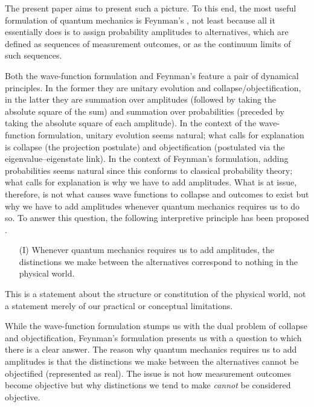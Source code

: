 The present paper aims to present such a picture. To this end, the most useful formulation of quantum mechanics is Feynman's \citep{FHS}, not least because all it essentially does is to assign probability amplitudes to alternatives, which are defined as sequences of measurement outcomes, or as the continuum limits of such sequences. 

Both the wave-function formulation and Feynman's feature a pair of dynamical principles. In the former they are unitary evolution and collapse/objectification, in the latter they are summation over amplitudes (followed by taking the absolute square of the sum) and summation over probabilities (preceded by taking the absolute square of each amplitude). In the context of the wave-function formulation, unitary evolution seems natural; what calls for explanation is collapse (the projection postulate) and objectification (postulated via the eigenvalue--eigenstate link). In the context of Feynman's formulation, adding probabilities seems natural since this conforms to classical probability theory; what calls for explanation is why we have to add amplitudes. What is at issue, therefore, is not what causes wave functions to collapse and outcomes to exist but why we have to add amplitudes whenever quantum mechanics requires us to do so. To answer this question, the following interpretive principle has been proposed \citep{Mohrhoff2014}.  
\begin{itemize}
\item[(I)] Whenever quantum mechanics requires us to add amplitudes, the distinctions we make between the alternatives correspond to nothing in the physical world.
\end{itemize}
This is a statement about the structure or constitution of the physical world, not a statement merely of our practical or conceptual limitations.

While the wave-function formulation stumps us with the dual problem of collapse and objectification, Feynman's formulation presents us with a question to which there is a clear answer. The reason why quantum mechanics requires us to add amplitudes is that the distinctions we make between the alternatives cannot be objectified (represented as real). The issue is not how measurement outcomes become objective but why distinctions we tend to make \emph{cannot} be considered objective.

